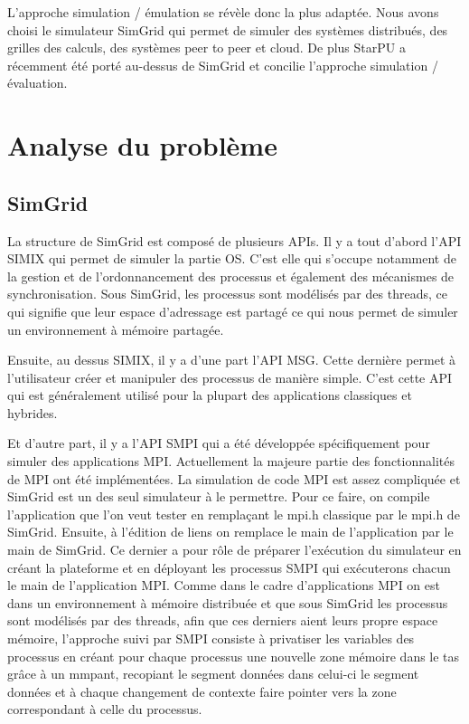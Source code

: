 \documentclass[smallextended]{svjour3}
\begin{document}
L'approche simulation / émulation se révèle donc la plus adaptée.
Nous avons choisi le simulateur SimGrid qui permet de simuler des
systèmes distribués, des grilles des calculs, des systèmes peer to
peer et cloud. De plus StarPU a récemment été porté au-dessus de
SimGrid et concilie l'approche simulation / évaluation.

\section{Analyse du problème}
\label{sec-3}
\subsection{SimGrid}
\label{sec-3-1}
La structure de SimGrid est composé de plusieurs APIs. Il y a tout
d'abord l'API SIMIX qui permet de simuler la partie OS. C'est elle
qui s'occupe notamment de la gestion et de l'ordonnancement des
processus et également des mécanismes de synchronisation. Sous
SimGrid, les processus sont modélisés par des threads, ce qui
signifie que leur espace d'adressage est partagé ce qui nous permet
de simuler un environnement à mémoire partagée. 

Ensuite, au dessus SIMIX, il y a d'une part l'API MSG. Cette dernière
permet à l'utilisateur créer et manipuler des processus de manière
simple. C'est cette API qui est généralement utilisé pour la
plupart des applications classiques et hybrides. 

Et d'autre part, il y a l'API SMPI qui a été développée
spécifiquement pour simuler des applications MPI. Actuellement la
majeure partie des fonctionnalités de MPI ont été implémentées. La
simulation de code MPI est assez compliquée et SimGrid est un des
seul simulateur à le permettre. Pour ce faire, on compile
l'application que l'on veut tester en remplaçant le mpi.h classique
par le mpi.h de SimGrid. Ensuite, à l'édition de liens on remplace
le main de l'application par le main de SimGrid. Ce dernier a pour
rôle de préparer l'exécution du simulateur en créant la plateforme
et en déployant les processus SMPI qui exécuterons chacun le main
de l'application MPI. Comme dans le cadre d'applications MPI on est
dans un environnement à mémoire distribuée et que sous SimGrid les
processus sont modélisés par des threads, afin que ces derniers
aient leurs propre espace mémoire, l'approche suivi par SMPI
consiste à privatiser les variables des processus en créant pour
chaque processus une nouvelle zone mémoire dans le tas grâce à un
mmpant, recopiant le segment données dans celui-ci le segment
données et à chaque changement de contexte faire pointer vers la
zone correspondant à celle du processus. 
\end{document}
